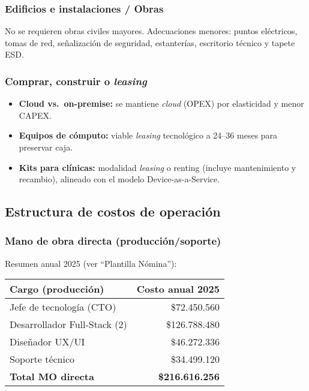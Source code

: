 \subsubsection{Edificios e instalaciones / Obras}
No se requieren obras civiles mayores. Adecuaciones menores: puntos eléctricos, tomas de red, señalización de seguridad, estanterías, escritorio técnico y tapete ESD.

\subsubsection{Comprar, construir o \emph{leasing}}
\begin{itemize}
    \item \textbf{Cloud vs.\ on-premise:} se mantiene \emph{cloud} (OPEX) por elasticidad y menor CAPEX.
    \item \textbf{Equipos de cómputo:} viable \emph{leasing} tecnológico a 24--36 meses para preservar caja.
    \item \textbf{Kits para clínicas:} modalidad \emph{leasing} o renting (incluye mantenimiento y recambio), alineado con el modelo Device-as-a-Service.
\end{itemize}

\subsection{Estructura de costos de operación}

\subsubsection{Mano de obra directa (producción/soporte)}
Resumen anual 2025 (ver ``Plantilla Nómina''):
\begin{table}[H]
\centering
\renewcommand{\arraystretch}{1.12}
\begin{tabular}{p{6.6cm} r}
\toprule
\textbf{Cargo (producción)} & \textbf{Costo anual 2025}\\
\midrule
Jefe de tecnología (CTO) & \$72.450.560\\
Desarrollador Full-Stack (2) & \$126.788.480\\
Diseñador UX/UI & \$46.272.336\\
Soporte técnico & \$34.499.120\\
\midrule
\textbf{Total MO directa} & \textbf{\$216.616.256}\\
\bottomrule
\end{tabular}
\end{table}

